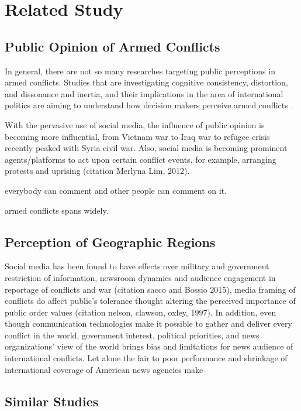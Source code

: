 \section{Related Study}
\subsection{Public Opinion of Armed Conflicts}
In general, there are not so many researches targeting public perceptions in armed conflicts. Studies that are investigating cognitive consistency, distortion, and dissonance and inertia, and their implications in the area of international politics are aiming to understand how decision makers perceive armed conflicts \cite{Jervis1976}.

With the pervasive use of social media, the influence of public opinion is becoming more influential, from Vietnam war to Iraq war to refugee crisis recently peaked with Syria civil war. Also, social media is becoming prominent agents/platforms to act upon certain conflict events, for example, arranging protests and uprising (citation Merlyna Lim, 2012).

everybody can comment and other people can comment on it.

armed conflicts spans widely.

\subsection{Perception of Geographic Regions}
Social media has been found to have effects over military and government restriction of information, newsroom dynamics and audience engagement in reportage of conflicts and war (citation sacco and Bossio 2015), media framing of conflicts do affect public's tolerance thought altering the perceived importance of public order values (citation nelson, clawson, oxley, 1997).  In addition, even though communication technologies make it possible to gather and deliver every conflict in the world, government interest, political priorities, and news organizations' view of the world brings bias and limitations for news audience of international conflicts. Let alone the fair to poor performance and shrinkage of international coverage of American news agencies make 



\subsection{Similar Studies}



